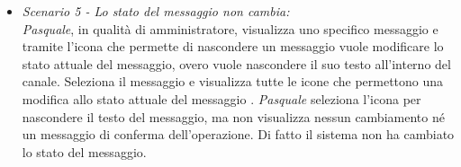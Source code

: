 \begin{itemize}
	\item \textit{Scenario 5 - Lo stato del messaggio non cambia:\\}
	\textit{Pasquale}, in qualità di amministratore, visualizza uno specifico messaggio e tramite l’icona che permette di nascondere  un messaggio vuole modificare lo stato attuale del messaggio, overo vuole nascondere il suo testo all’interno del canale. Seleziona il messaggio e visualizza tutte le icone che permettono una modifica allo stato attuale del messaggio . \textit{Pasquale} seleziona l’icona per nascondere il testo del messaggio, ma non visualizza nessun cambiamento né un messaggio di conferma dell’operazione. Di fatto il sistema non ha cambiato lo stato del messaggio.\\
\end{itemize}

